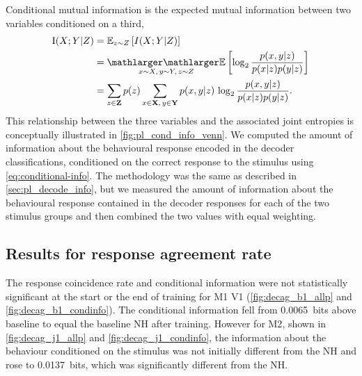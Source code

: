 Conditional mutual information is the expected mutual information between two variables conditioned on a third,
\begin{align}
\I(X;Y|Z)
  &= \E_{z\sim Z} \left[ I(X;Y|Z) \right] \notag
\\&= \EE_{x\sim X, \, y\sim Y, \, z\sim Z} \left[ \log_2 \frac{p(x,y|z)}{p(x|z)p(y|z)} \right] \notag
\\&= \sum_{z \in \SET{Z}} p(z) \sum_{x \in \SET{X}, \, y \in \SET{Y}} p(x,y|z) \, \log_2 \frac{p(x,y|z)}{p(x|z)p(y|z)}
\label{eq:conditional-info}
.\end{align}
This relationship between the three variables and the associated joint entropies is conceptually illustrated in \autoref{fig:pl_cond_info_venn}.
We computed the amount of information about the behavioural response encoded in the decoder classifications, conditioned on the correct response to the stimulus using \autoref{eq:conditional-info}.
The methodology was the same as described in \autoref{sec:pl_decode_info}, but we measured the amount of information about the behavioural response contained in the decoder responses for each of the two stimulus groups and then combined the two values with equal weighting.


\subsection{Results for response agreement rate}

The response coincidence rate and conditional information were not statistically significant at the start or the end of training for \ac{M1} \ac{V1} (\autoref{fig:decag_b1_allp} and \autoref{fig:decag_b1_condinfo}).
The conditional information fell from \SI{0.0065}{bits} above baseline to equal the baseline \ac{NH} after training.
However for \ac{M2}, shown in \autoref{fig:decag_j1_allp} and \autoref{fig:decag_j1_condinfo}, the information about the behaviour conditioned on the stimulus was not initially different from the \ac{NH} and rose to \SI{0.0137}{bits}, which was significantly different from the \ac{NH}.

